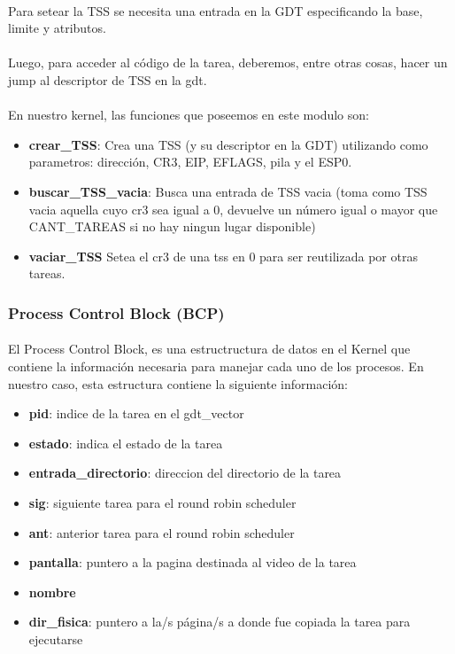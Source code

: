\documentclass[11pt, a4paper]{article}
\begin{document}
\paragraph{}
Para setear la TSS se necesita una entrada en la GDT especificando la base, limite y atributos.

\paragraph{}
Luego, para acceder al c\'odigo de la tarea, deberemos, entre otras cosas, hacer un jump al descriptor de TSS en la gdt.

\paragraph{}
En nuestro kernel, las funciones que poseemos en este modulo son:
\begin{itemize}
\item \textbf{crear\_TSS}: Crea una TSS (y su descriptor en la GDT) utilizando como parametros: dirección, CR3, EIP, EFLAGS, pila y el ESP0.
\item \textbf{buscar\_TSS\_vacia}: Busca una entrada de TSS vacia (toma como TSS vacia aquella cuyo cr3 sea igual a 0, devuelve un número igual o mayor que CANT\_TAREAS si no hay ningun lugar disponible)
\item \textbf{vaciar\_TSS} Setea el cr3 de una tss en 0 para ser reutilizada por otras tareas.
\end{itemize}
\subsubsection{Process Control Block (BCP) }

\paragraph{}
El Process Control Block, es una estructructura de datos en el Kernel que contiene la información necesaria para manejar cada uno de los procesos.
En nuestro caso, esta estructura contiene la siguiente información:
\begin{itemize}
\item \textbf{pid}: indice de la tarea en el gdt\_vector
\item \textbf{estado}: indica el estado de la tarea
\item \textbf{entrada\_directorio}: direccion del directorio de la tarea
\item \textbf{sig}: siguiente tarea para el round robin scheduler
\item \textbf{ant}: anterior tarea para el round robin scheduler
\item \textbf{pantalla}: puntero a la pagina destinada al video de la tarea
\item \textbf{nombre}
\item \textbf{dir\_fisica}: puntero a la/s página/s a donde fue copiada la tarea para ejecutarse
\end{itemize}
\end{document}
